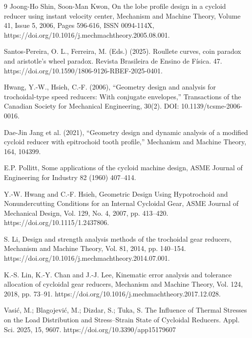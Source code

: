 \documentclass[internal]{../../../classes/nervtech-research}
\begin{document}
\begin{thebibliography}{9}
  Joong-Ho Shin, Soon-Man Kwon, On the lobe profile design in a cycloid reducer using instant velocity center, Mechanism and Machine Theory, Volume 41, Issue 5, 2006, Pages 596-616, ISSN 0094-114X, https://doi.org/10.1016/j.mechmachtheory.2005.08.001.

  Santos-Pereira, O. L., Ferreira, M. (Eds.) (2025). Roullete curves, coin paradox and aristotle's wheel paradox. Revista Brasileira de Ensino de Física. 47. https://doi.org/10.1590/1806-9126-RBEF-2025-0401.

  Hwang, Y.-W., Hsieh, C.-F. (2006), “Geometry design and analysis for trochoidal-type speed reducers: With conjugate envelopes,” Transactions of the Canadian Society for Mechanical Engineering, 30(2). DOI: 10.1139/tcsme-2006-0016.

  Dae-Jin Jang et al. (2021), “Geometry design and dynamic analysis of a modified cycloid reducer with epitrochoid tooth profile,” Mechanism and Machine Theory, 164, 104399.

  E.P. Pollitt, Some applications of the cycloid machine design, ASME Journal of Engineering for Industry 82 (1960)
  407–414.

  Y.-W. Hwang and C.-F. Hsieh,
  Geometric Design Using Hypotrochoid and Nonundercutting Conditions for an
  Internal Cycloidal Gear,
  ASME Journal of Mechanical Design,
  Vol. 129, No. 4, 2007, pp. 413--420.
  https://doi.org/10.1115/1.2437806.

  S. Li,
  Design and strength analysis methods of the trochoidal gear reducers,
  Mechanism and Machine Theory,
  Vol. 81, 2014, pp. 140--154.
  https://doi.org/10.1016/j.mechmachtheory.2014.07.001.

  K.-S. Lin, K.-Y. Chan and J.-J. Lee,
  Kinematic error analysis and tolerance allocation of cycloidal gear reducers,
  Mechanism and Machine Theory,
  Vol. 124, 2018, pp. 73--91.
  https://doi.org/10.1016/j.mechmachtheory.2017.12.028.

  Vasić, M.; Blagojević, M.; Dizdar, S.; Tuka, S. The Influence of Thermal Stresses on the Load Distribution and Stress–Strain State of Cycloidal Reducers. Appl. Sci. 2025, 15, 9607. https://doi.org/10.3390/app15179607
\end{thebibliography}
\end{document}
